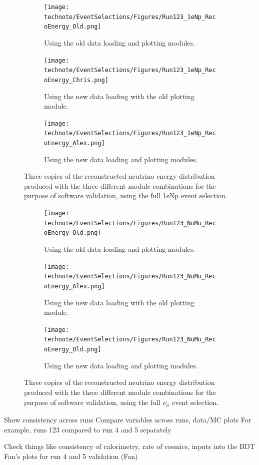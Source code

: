 \begin{figure}[H]
 \centering
    \begin{subfigure}[t]{0.32\linewidth}
        \texttt{[image: technote/EventSelections/Figures/Run123\_1eNp\_RecoEnergy\_Old.png]}
        \caption{Using the old data loading and plotting modules.}
    \end{subfigure}%
    \hspace{0.3cm}%
    \begin{subfigure}[t]{0.32\linewidth}
        \texttt{[image: technote/EventSelections/Figures/Run123\_1eNp\_RecoEnergy\_Chris.png]}%
        \caption{Using the new data loading with the old plotting module.}
    \end{subfigure}%
    \hspace{0.3cm}%
    \begin{subfigure}[t]{0.31\linewidth}
        \texttt{[image: technote/EventSelections/Figures/Run123\_1eNp\_RecoEnergy\_Alex.png]}
        \caption{Using the new data loading and plotting modules.}
    \end{subfigure}%
    \caption{Three copies of the reconstructed neutrino energy distribution produced with the three different module combinations for the purpose of software validation, using the full 1eNp event selection.}
    \label{fig:distvalidation_1eNp}
\end{figure}

\begin{figure}[H]
 \centering
    \begin{subfigure}[t]{0.32\linewidth}
        \texttt{[image: technote/EventSelections/Figures/Run123\_NuMu\_RecoEnergy\_Old.png]}
        \caption{Using the old data loading and plotting modules.}
    \end{subfigure}%
    \hspace{0.3cm}%
    \begin{subfigure}[t]{0.32\linewidth}
        \texttt{[image: technote/EventSelections/Figures/Run123\_NuMu\_RecoEnergy\_Alex.png]}%
        \caption{Using the new data loading with the old plotting module.}
    \end{subfigure}%
    \hspace{0.3cm}%
    \begin{subfigure}[t]{0.31\linewidth}
        \texttt{[image: technote/EventSelections/Figures/Run123\_NuMu\_RecoEnergy\_Old.png]}
        \caption{Using the new data loading and plotting modules.}
    \end{subfigure}%
    \caption{Three copies of the reconstructed neutrino energy distribution produced with the three different module combinations for the purpose of software validation, using the full $\nu_{\mu}$ event selection.}
    \label{fig:distvalidation_NuMu}
\end{figure}

Show consistency across runs
Compare variables across runs, data/MC plots 
For example, runs 123 compared to run 4 and 5 separately

Check things like consistency of calorimetry, rate of cosmics, inputs into the BDT
Fan's plots for run 4 and 5 validation (Fan)